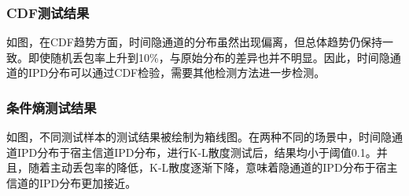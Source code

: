 
\subsubsection{CDF测试结果}
\label{chap:analyze:result:ipd:cdf}

如图，在CDF趋势方面，时间隐通道的分布虽然出现偏离，但总体趋势仍保持一致。即使随机丢包率上升到10\%，与原始分布的差异也并不明显。因此，时间隐通道的IPD分布可以通过CDF检验，需要其他检测方法进一步检测。

\subsubsection{条件熵测试结果}
\label{chap:analyze:result:ipd:kld}

如图，不同测试样本的测试结果被绘制为箱线图。在两种不同的场景中，时间隐通道IPD分布于宿主信道IPD分布，进行K-L散度测试后，结果均小于阈值0.1。并且，随着主动丢包率的降低，K-L散度逐渐下降，意味着隐通道的IPD分布于宿主信道的IPD分布更加接近。

